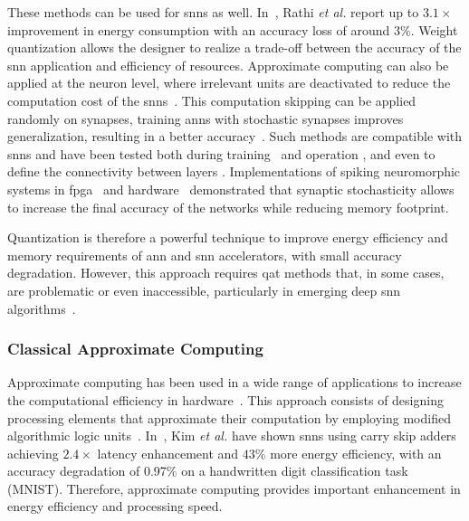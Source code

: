 These methods can be used for \glspl{snn} as well. In~\cite{rathi2018stdp}, Rathi \textit{et al.} report up to $3.1\times$ improvement in energy consumption with an accuracy loss of around $3\%$. Weight quantization allows the designer to realize a trade-off between the accuracy of the \gls{snn} application and efficiency of resources. Approximate computing can also be applied at the neuron level, where irrelevant units are deactivated to reduce the computation cost of the \glspl{snn}~\cite{sen2017approximate}. This computation skipping can be applied randomly on synapses, training \glspl{ann} with stochastic synapses improves generalization, resulting in a better accuracy~\cite{srivastava2014dropout, wan2013regularization}. Such methods are compatible with \glspl{snn} and have been tested both during training~\cite{neftci2016stochastic, srinivasan2016magnetic} and operation \cite{buesing2011neural}, and even to define the connectivity between layers \cite{bellec2017deep, chen20184096}. Implementations of spiking neuromorphic systems in \gls{fpga}~\cite{sheik2016synaptic} and hardware~\cite{jerry2017ultra} demonstrated that synaptic stochasticity allows to increase the final accuracy of the networks while reducing memory footprint.

Quantization is therefore a powerful technique to improve energy efficiency and memory requirements of \gls{ann} and \gls{snn} accelerators, with small accuracy degradation. However, this approach requires \gls{qat} methods that, in some cases, are problematic or even inaccessible, particularly in emerging deep \gls{snn} algorithms~\cite{zhang2018survey}.

\subsubsection{Classical Approximate Computing}
Approximate computing has been used in a wide range of applications to increase the computational efficiency in hardware~\cite{han2013approximate}. This approach consists of designing processing elements that approximate their computation by employing modified algorithmic logic units~\cite{han2013approximate}. In~\cite{kim2013energy}, Kim \textit{et al.} have shown \glspl{snn} using carry skip adders achieving $2.4\times$ latency enhancement and $43\%$ more energy efficiency, with an accuracy degradation of 0.97\% on a handwritten digit classification task (MNIST). Therefore, approximate computing provides important enhancement in energy efficiency and processing speed.

